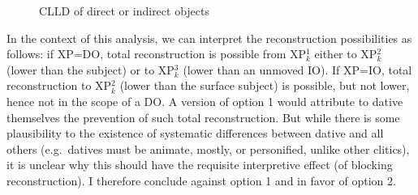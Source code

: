 \documentclass[output=paper]{langsci/langscibook}
\begin{document}
\begin{figure}
    \caption{\Glsdesc{CLLD} of direct or indirect objects\label{fig:fromex:clitics}}
\end{figure}

In the context of this analysis, we can interpret the reconstruction
possibilities as follows: if XP=DO, total reconstruction is possible from
XP$_k^1$ either to XP$_k^2$   (lower than the subject) or to XP$_k^3$ (lower
than an unmoved IO). If XP=IO, total reconstruction to  XP$_k^2$ (lower than
the surface subject) is possible, but not lower, hence not in the scope of a
DO.  A version of option 1 would attribute to dative  themselves the
prevention of such total reconstruction. But while there is some plausibility
to the existence of systematic differences between dative  and all
others (e.g.\ datives must be animate, mostly, or personified, unlike other
clitics), it is unclear why this should have the requisite interpretive effect
(of blocking reconstruction). I therefore conclude against option 1 and in
favor of option 2.
\end{document}
